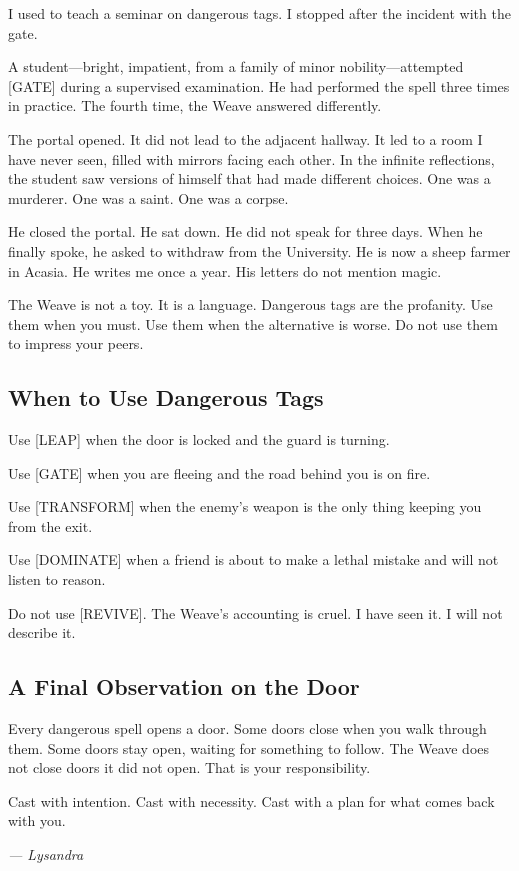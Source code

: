 I used to teach a seminar on dangerous tags. I stopped after the incident with the gate.

A student---bright, impatient, from a family of minor nobility---attempted [GATE] during a supervised examination. He had performed the spell three times in practice. The fourth time, the Weave answered differently.

The portal opened. It did not lead to the adjacent hallway. It led to a room I have never seen, filled with mirrors facing each other. In the infinite reflections, the student saw versions of himself that had made different choices. One was a murderer. One was a saint. One was a corpse.

He closed the portal. He sat down. He did not speak for three days. When he finally spoke, he asked to withdraw from the University. He is now a sheep farmer in Acasia. He writes me once a year. His letters do not mention magic.

The Weave is not a toy. It is a language. Dangerous tags are the profanity. Use them when you must. Use them when the alternative is worse. Do not use them to impress your peers.

\subsection{When to Use Dangerous Tags}

Use [LEAP] when the door is locked and the guard is turning.

Use [GATE] when you are fleeing and the road behind you is on fire.

Use [TRANSFORM] when the enemy's weapon is the only thing keeping you from the exit.

Use [DOMINATE] when a friend is about to make a lethal mistake and will not listen to reason.

Do not use [REVIVE]. The Weave's accounting is cruel. I have seen it. I will not describe it.

\subsection{A Final Observation on the Door}

Every dangerous spell opens a door. Some doors close when you walk through them. Some doors stay open, waiting for something to follow. The Weave does not close doors it did not open. That is your responsibility.

Cast with intention. Cast with necessity. Cast with a plan for what comes back with you.

\textit{--- Lysandra}
